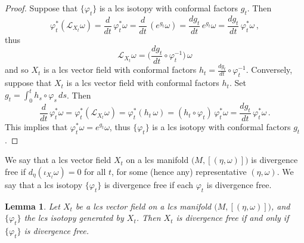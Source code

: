 \documentclass{amsart}
\newtheorem{lemma}[thm]{Lemma}
\theoremstyle{remark}
\begin{document}
\begin{proof}
Suppose that $\{\varphi_t\}$ is a lcs isotopy
with conformal factors $g_t$.
Then
\[
\varphi_t^{\ast} (\mathcal{L}_{X_t} \omega)
= \frac{d}{dt} \, \varphi_t^{\ast} \omega
= \frac{d}{dt} \, (e^{g_t} \omega)
= \frac{dg_t}{dt} \, e^{g_t} \omega
= \frac{dg_t}{dt} \, \varphi_t^{\ast} \omega \,,
\]
thus
\[
\mathcal{L}_{X_t} \omega
= \Big( \frac{dg_t}{dt} \circ \varphi_t^{-1} \Big) \, \omega
\]
and so $X_t$ is a lcs vector field
with conformal factors $h_t = \frac{dg_t}{dt} \circ \varphi_t^{-1}$.
Conversely, suppose that $X_t$ is a lcs vector field
with conformal factors $h_t$.
Set $g_t = \int_0^t h_s \circ \varphi_s \, ds$.
Then 
\[
\frac{d}{dt} \, \varphi_t^{\ast} \omega
= \varphi_t^{\ast} (\mathcal{L}_{X_t} \omega)
= \varphi_t^{\ast} (h_t \, \omega)
= (h_t \circ \varphi_t) \, \varphi_t^{\ast} \omega
= \frac{dg_t}{dt} \, \varphi_t^{\ast} \omega \,.
\]
This implies that $\varphi_t^{\ast} \omega = e^{g_t} \omega$,
thus $\{\varphi_t\}$ is a lcs isotopy with conformal factors $g_t$.
\end{proof}

We say that a lcs vector field $X_t$
on a lcs manifold $\big(M, [(\eta, \omega)]\big)$
is divergence free if $d_{\eta} (\iota_{X_t} \omega) = 0$ for all $t$,
for some (hence any) representative $(\eta, \omega)$.
We say that a lcs isotopy $\{\varphi_t\}$
is divergence free if each $\varphi_t$ is divergence free.

\begin{lemma}\label{lemma: lift of isotopy to symplectic cover}
Let $X_t$ be a lcs vector field
on a lcs manifold $\big(M, [(\eta, \omega)]\big)$,
and $\{\varphi_t\}$ the lcs isotopy generated by $X_t$.
Then $X_t$ is divergence free if and only if
$\{\varphi_t\}$ is divergence free.
\end{lemma}
\end{document}

